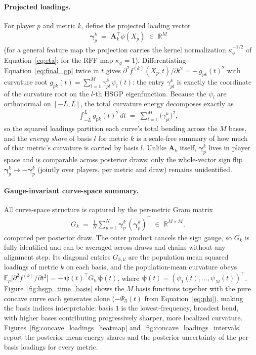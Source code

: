 \paragraph{Projected loadings.}
For player $p$ and metric $k$, define the projected loading vector
\begin{align}
\label{eq:concave_loadings}
  \boldsymbol\gamma^{k}_p \;=\; \mathbf{A}_k^\top \phi(X_p) \;\in\; \mathbb{R}^{M}
\end{align}
(for a general feature map the projection carries the kernel normalization $\kappa_\phi^{-1/2}$ of Equation~\ref{eq:eta}; for the RFF map $\kappa_\phi = 1$).  Differentiating Equation~\ref{eq:final_gp} twice in $t$ gives $\partial^2 f^{(k)}(X_p, t)/\partial t^2 = -\,g_{pk}(t)^2$ with curvature root $g_{pk}(t) = \sum_{l=1}^M \gamma^k_{pl}\, \psi_l(t)$: the entry $\gamma^k_{pl}$ is exactly the coordinate of the curvature root on the $l$-th HSGP eigenfunction.  Because the $\psi_l$ are orthonormal on $[-L, L]$, the total curvature energy decomposes exactly as
\begin{align}
  \int_{-L}^{L} g_{pk}(t)^2 \, dt \;=\; \sum_{l=1}^M \bigl(\gamma^k_{pl}\bigr)^2,
\end{align}
so the squared loadings partition each curve's total bending across the $M$ bases, and the \emph{energy share} of basis $l$ for metric $k$ is a scale-free summary of how much of that metric's curvature is carried by basis $l$.  Unlike $\mathbf{A}_k$ itself, $\boldsymbol\gamma^k_p$ lives in player space and is comparable across posterior draws; only the whole-vector sign flip $\boldsymbol\gamma^k_p \mapsto -\boldsymbol\gamma^k_p$ (jointly over players, per metric and draw) remains unidentified.

\paragraph{Gauge-invariant curve-space summary.}
All curve-space structure is captured by the per-metric Gram matrix
\begin{align}
\label{eq:concave_gram}
  G_k \;=\; \frac{1}{N} \sum_{p=1}^{N} \boldsymbol\gamma^k_p \, (\boldsymbol\gamma^k_p)^\top \;\in\; \mathbb{R}^{M \times M},
\end{align}
computed per posterior draw.  The outer product cancels the sign gauge, so $G_k$ is fully identified and can be averaged across draws and chains without any alignment step.  Its diagonal entries $G_{k,ll}$ are the population mean squared loadings of metric $k$ on each basis, and the population-mean curvature obeys $\mathbb{E}_p\bigl[\partial^2 f^{(k)}/\partial t^2\bigr] = -\,\boldsymbol\psi(t)^\top G_k\, \boldsymbol\psi(t)$, where $\boldsymbol\psi(t) = (\psi_1(t), \ldots, \psi_M(t))^\top$.  Figure~\ref{fig:hsgp_time_basis} shows the $M$ basis functions together with the pure concave curve each generates alone ($-\Psi_{ll}(t)$ from Equation~\ref{eq:phi}), making the basis indices interpretable: basis $1$ is the lowest-frequency, broadest bend, with higher bases contributing progressively sharper, more localized curvature.  Figures~\ref{fig:concave_loadings_heatmap} and~\ref{fig:concave_loadings_intervals} report the posterior-mean energy shares and the posterior uncertainty of the per-basis loadings for every metric.

